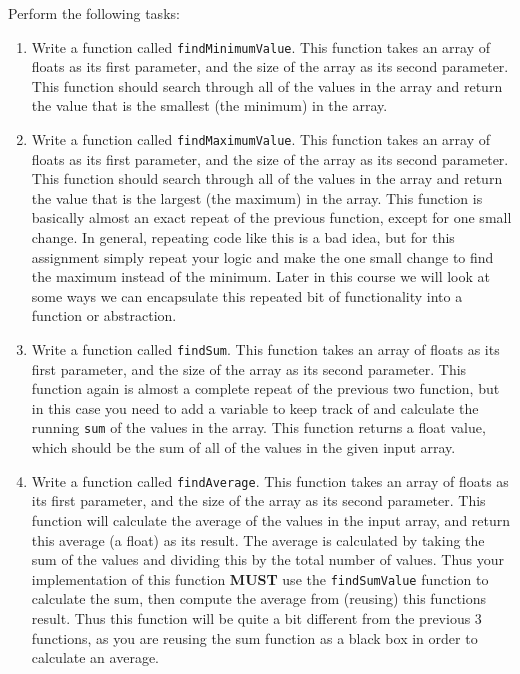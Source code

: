\documentclass[11pt]{article}
\begin{document}
Perform the following tasks:

\begin{enumerate}
\item Write a function called \verb~findMinimumValue~.  This function takes
   an array of floats as its first parameter, and the size of the
   array as its second parameter.  This function should search through
   all of the values in the array and return the value that is the
   smallest (the minimum) in the array.
\item Write a function called \verb~findMaximumValue~.  This function takes an
   array of floats as its first parameter, and the size of the array
   as its second parameter.  This function should search through all
   of the values in the array and return the value that is the largest
   (the maximum) in the array.  This function is basically almost an
   exact repeat of the previous function, except for one small change.
   In general, repeating code like this is a bad idea, but for this
   assignment simply repeat your logic and make the one small change
   to find the maximum instead of the minimum.  Later in this course
   we will look at some ways we can encapsulate this repeated bit of
   functionality into a function or abstraction.
\item Write a function called \verb~findSum~.  This function takes an
   array of floats as its first parameter, and the size of the array
   as its second parameter.  This function again is almost a complete
   repeat of the previous two function, but in this case you need to
   add a variable to keep track of and calculate the running \verb~sum~ of
   the values in the array.  This function returns a float value,
   which should be the sum of all of the values in the given input
   array.
\item Write a function called \verb~findAverage~.  This function takes
   an array of floats as its first parameter, and the size of the array
   as its second parameter.  This function will calculate the average
   of the values in the input array, and return this average (a float)
   as its result.  The average is calculated by taking the sum of the
   values and dividing this by the total number of values.  Thus
   your implementation of this function \textbf{MUST} use the \verb~findSumValue~
   function to calculate the sum, then compute the average from
   (reusing) this functions result.  Thus this function will be quite a
   bit different from the previous 3 functions, as you are reusing the
   sum function as a black box in order to calculate an average.

\end{enumerate}
\end{document}
